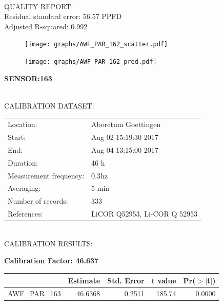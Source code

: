 \documentclass[oneside]{report}
\begin{document}
\hrulefill\\
QUALITY REPORT:\\
Residual standard error: 56.57 PPFD\\
Adjusted R-squared: 0.992



\begin{figure}[H]
  \centering
  \texttt{[image: graphs/AWF\_PAR\_162\_scatter.pdf]}
\end{figure}




\begin{figure}[H]
  \centering
  \texttt{[image: graphs/AWF\_PAR\_162\_pred.pdf]}
\end{figure}

\pagebreak


\begin{center}
\large{\textbf{SENSOR:163}}\\
\end{center}

\hrulefill\\
CALIBRATION DATASET:\\
\begin{table}[h!]
  \centering
  \label{tab:table1}
  \begin{tabular}{ll}
    Location: & Aboretum Goettingen\\ 
    
    
    Start:  & Aug 02 15:19:30 2017 \\
    End:   & Aug 04 13:15:00 2017\\ 
    Duration: & 46 h\\
    Measurement frequency: & 0.3hz\\
    Averaging:  &5 min\\
    Number of records: & 333 \\
    References: & LiCOR Q52953, Li-COR Q 52953 \\
  \end{tabular}
\end{table}

\hrulefill\\
CALIBRATION RESULTS:\\


\begin{center}
\textbf{\large{Calibration Factor: 46.637}}\\
\end{center}
\begin{table}[ht]
\centering
\begin{tabular}{rrrrr}
  \hline
 & Estimate & Std. Error & t value & Pr($>$$|$t$|$) \\ 
  \hline
AWF\_PAR\_163 & 46.6368 & 0.2511 & 185.74 & 0.0000 \\ 
   \hline
\end{tabular}
\end{table}
\end{document}
